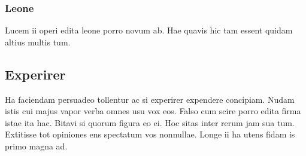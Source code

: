 \documentclass[11pt]{article}
\begin{document}
\subsubsection{Leone}

Lucem ii operi edita leone porro novum ab. Hae quavis hic tam essent quidam altius multis tum. 

\subsection{Experirer}

Ha faciendam persuadeo tollentur ac si experirer expendere concipiam. Nudam istis cui majus vapor verba omnes usu vox eos. Falso cum scire porro edita firma istae ita hac. Bitavi si quorum figura eo ei. Hoc sitas inter rerum jam sua tum. Extitisse tot opiniones ens spectatum vos nonnullae. Longe ii ha utens fidam is primo magna ad.



\newpage



\end{document}
